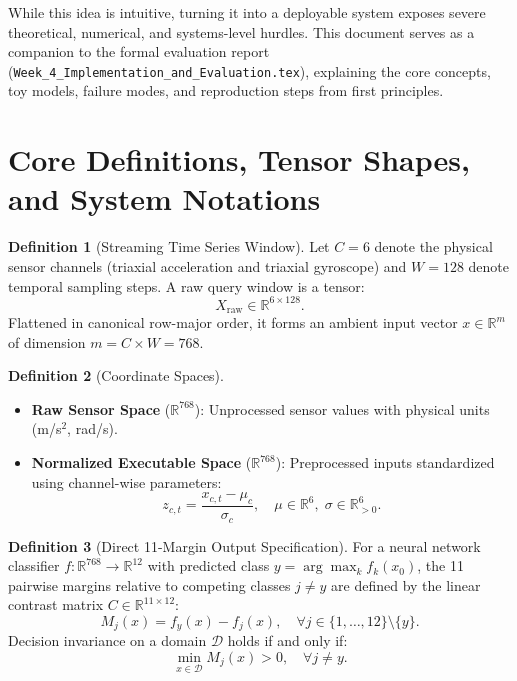 \documentclass[11pt,article]{article}
\theoremstyle{definition}
\newtheorem{definition}{Definition}
\begin{document}
While this idea is intuitive, turning it into a deployable system exposes severe theoretical, numerical, and systems-level hurdles. This document serves as a companion to the formal evaluation report (\texttt{Week\_4\_Implementation\_and\_Evaluation.tex}), explaining the core concepts, toy models, failure modes, and reproduction steps from first principles.

\section{Core Definitions, Tensor Shapes, and System Notations}

\begin{definition}[Streaming Time Series Window]
Let $C=6$ denote the physical sensor channels (triaxial acceleration and triaxial gyroscope) and $W=128$ denote temporal sampling steps. A raw query window is a tensor:
\begin{equation}
X_{\text{raw}} \in \mathbb{R}^{6 \times 128}.
\end{equation}
Flattened in canonical row-major order, it forms an ambient input vector $x \in \mathbb{R}^{m}$ of dimension $m = C \times W = 768$.
\end{definition}

\begin{definition}[Coordinate Spaces]
\begin{itemize}
    \item \textbf{Raw Sensor Space} ($\mathbb{R}^{768}$): Unprocessed sensor values with physical units (m/s$^2$, rad/s).
    \item \textbf{Normalized Executable Space} ($\mathbb{R}^{768}$): Preprocessed inputs standardized using channel-wise parameters:
    \begin{equation}
    z_{c, t} = \frac{x_{c, t} - \mu_c}{\sigma_c}, \quad \mu \in \mathbb{R}^6, \; \sigma \in \mathbb{R}^6_{>0}.
    \end{equation}
\end{itemize}
\end{definition}

\begin{definition}[Direct 11-Margin Output Specification]
For a neural network classifier $f: \mathbb{R}^{768} \to \mathbb{R}^{12}$ with predicted class $y = \arg\max_k f_k(x_0)$, the 11 pairwise margins relative to competing classes $j \neq y$ are defined by the linear contrast matrix $C \in \mathbb{R}^{11 \times 12}$:
\begin{equation}
M_j(x) = f_y(x) - f_j(x), \quad \forall j \in \{1,\dots,12\} \setminus \{y\}.
\end{equation}
Decision invariance on a domain $\mathcal{D}$ holds if and only if:
\begin{equation}
\min_{x \in \mathcal{D}} M_j(x) > 0, \quad \forall j \neq y.
\end{equation}
\end{definition}
\end{document}
